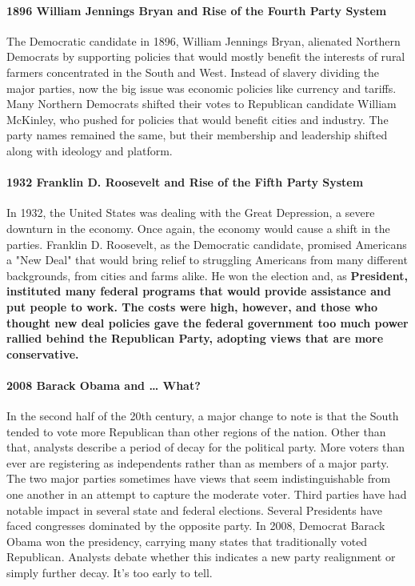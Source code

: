 \paragraph{1896 William Jennings Bryan and Rise of the Fourth Party System} The
Democratic candidate in 1896, William Jennings Bryan, alienated Northern
Democrats by supporting policies that would mostly benefit the interests of
rural farmers concentrated in the South and West. Instead of slavery dividing
the major parties, now the big issue was economic policies like currency and
tariffs. Many Northern Democrats shifted their votes to Republican candidate
William McKinley, who pushed for policies that would benefit cities and
industry. The party names remained the same, but their membership and leadership
shifted along with ideology and platform.

\paragraph{1932 Franklin D. Roosevelt and Rise of the Fifth Party System} In
1932, the United States was dealing with the Great Depression, a severe downturn
in the economy. Once again, the economy would cause a shift in the parties.
Franklin D. Roosevelt, as the Democratic candidate, promised Americans a "New
Deal" that would bring relief to struggling Americans from many different
backgrounds, from cities and farms alike. He won the election and, as
\bf{President}, instituted many federal programs that would provide assistance
and put people to work. The costs were high, however, and those who thought new
deal policies gave the federal government too much power rallied behind the
Republican Party, adopting views that are more conservative.

\paragraph{2008 Barack Obama and … What?} In the second half of the 20th
century, a major change to note is that the South tended to vote more Republican
than other regions of the nation. Other than that, analysts describe a period of
decay for the political party. More voters than ever are registering as
independents rather than as members of a major party. The two major parties
sometimes have views that seem indistinguishable from one another in an attempt
to capture the moderate voter. Third parties have had notable impact in several
state and federal elections. Several Presidents have faced congresses dominated
by the opposite party. In 2008, Democrat Barack Obama won the presidency,
carrying many states that traditionally voted Republican. Analysts debate
whether this indicates a new party realignment or simply further decay. It's too
early to tell.

